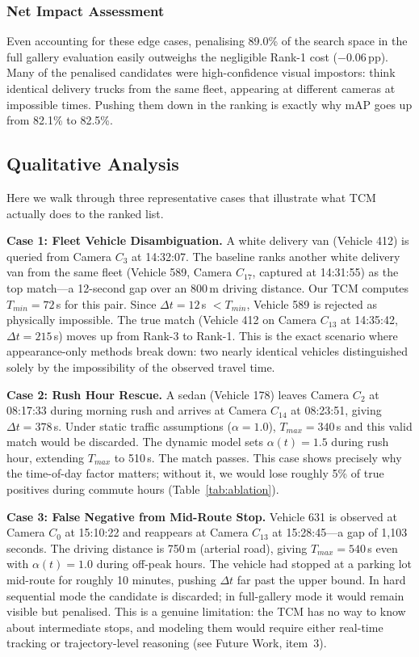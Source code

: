 \documentclass{ijitcs}
\newcommand{\rev}[1]{#1}
\begin{document}
\subsubsection{Net Impact Assessment}
Even accounting for these edge cases, penalising 89.0\% of the search space in the full gallery evaluation easily outweighs the negligible Rank-1 cost ($-$0.06\,pp). Many of the penalised candidates were high-confidence visual impostors: think identical delivery trucks from the same fleet, appearing at different cameras at impossible times. Pushing them down in the ranking is exactly why mAP goes up from 82.1\% to 82.5\%.

\subsection{Qualitative Analysis}
Here we walk through three representative cases that illustrate what TCM actually does to the ranked list.

\textbf{Case 1: Fleet Vehicle Disambiguation.} A white delivery van (Vehicle 412) is queried from Camera $C_3$ at 14:32:07. The baseline ranks another white delivery van from the same fleet (Vehicle 589, Camera $C_{17}$, captured at 14:31:55) as the top match---a 12-second gap over an 800\,m driving distance. Our TCM computes $T_{min} = 72$\,s for this pair. Since $\Delta t = 12$\,s $< T_{min}$, Vehicle 589 is rejected as physically impossible. The true match (Vehicle 412 on Camera $C_{13}$ at 14:35:42, $\Delta t = 215$\,s) moves up from Rank-3 to Rank-1. This is the exact scenario where appearance-only methods break down: two nearly identical vehicles distinguished solely by the impossibility of the observed travel time.

\textbf{Case 2: Rush Hour Rescue.} A sedan (Vehicle 178) leaves Camera $C_2$ at 08:17:33 during morning rush and arrives at Camera $C_{14}$ at 08:23:51, giving $\Delta t = 378$\,s. Under static traffic assumptions ($\alpha = 1.0$), $T_{max} = 340$\,s and this valid match would be discarded. The dynamic model sets $\alpha(t) = 1.5$ during rush hour, extending $T_{max}$ to 510\,s. The match passes. This case shows precisely why the time-of-day factor matters; without it, we would lose roughly 5\% of true positives during commute hours (Table~\ref{tab:ablation}).

\textbf{Case 3: False Negative from Mid-Route Stop.} Vehicle 631 is observed at Camera $C_0$ at 15:10:22 and reappears at Camera $C_{13}$ at 15:28:45---a gap of 1,103 seconds. The driving distance is 750\,m (arterial road), giving $T_{max} = 540$\,s even with $\alpha(t) = 1.0$ during off-peak hours. The vehicle had stopped at a parking lot mid-route for roughly 10 minutes, pushing $\Delta t$ far past the upper bound. \rev{In hard sequential mode the candidate is discarded; in full-gallery mode it would remain visible but penalised.} This is a genuine limitation: the TCM has no way to know about intermediate stops, and modeling them would require either real-time tracking or trajectory-level reasoning (see Future Work, item~3).
\end{document}
